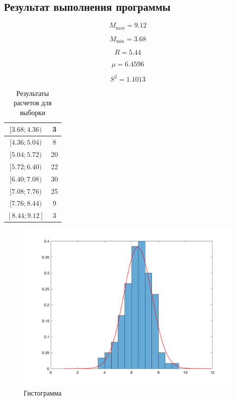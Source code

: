 \documentclass[12pt, a4paper]{report}
\begin{document}
	\vspace{0.5cm}
	\subsection{Результат выполнения программы}
	
	\begin{equation*}
	M_{\max} = 9.12
	\end{equation*}
	
	\begin{equation*}
	M_{\min} = 3.68
	\end{equation*}
	
	\begin{equation*}
	R = 5.44
	\end{equation*}
	
	\begin{equation*}
	\mu = 6.4596
	\end{equation*}
	
	\begin{equation*}
	S^2 = 1.1013
	\end{equation*}
	
	\begin{table}[H]
		\centering
		\begin{tabular}{|c|c|}
			\hline
			$[3.68;4.36)$ & 3 \\
			\hline
			$[4.36;5.04)$ & 8 \\
			\hline
			$[5.04;5.72)$ & 20 \\
			\hline
			$[5.72;6.40)$ & 22 \\
			\hline
			$[6.40;7.08)$ & 30 \\
			\hline
			$[7.08;7.76)$ & 25 \\
			\hline
			$[7.76;8.44)$ & 9 \\
			\hline
			$[8.44;9.12]$ & 3 \\
			\hline
		\end{tabular}
		\caption{Результаты расчетов для выборки}
	\end{table}

	\newpage


	\begin{figure}[H]
		\centering
		\includegraphics[scale=0.52]{img/Gistogramma.png}
		\caption{Гистограмма}
	\end{figure}
\end{document}
